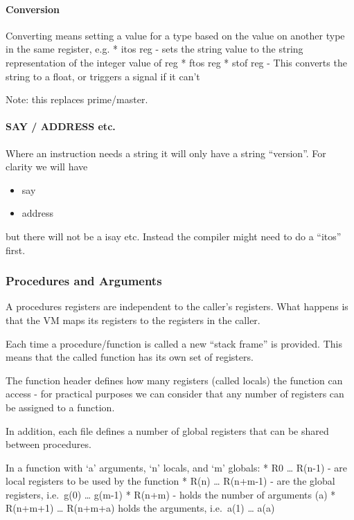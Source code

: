 \hypertarget{conversion}{%
\paragraph{Conversion}\label{conversion}}

Converting means setting a value for a type based on the value on
another type in the same register, e.g. * itos reg - sets the string
value to the string representation of the integer value of reg * ftos
reg * stof reg - This converts the string to a float, or triggers a
signal if it can't

Note: this replaces prime/master.

\hypertarget{say-address-etc.}{%
\paragraph{SAY / ADDRESS etc.}\label{say-address-etc.}}

Where an instruction needs a string it will only have a string
``version''. For clarity we will have

\begin{itemize}
\tightlist
\item
  say
\item
  address
\end{itemize}

but there will not be a isay etc. Instead the compiler might need to do
a ``itos'' first.

\hypertarget{procedures-and-arguments}{%
\subsubsection{Procedures and
Arguments}\label{procedures-and-arguments}}

A procedures registers are independent to the caller's registers. What
happens is that the VM maps its registers to the registers in the
caller.

Each time a procedure/function is called a new ``stack frame'' is
provided. This means that the called function has its own set of
registers.

The function header defines how many registers (called locals) the
function can access - for practical purposes we can consider that any
number of registers can be assigned to a function.

In addition, each file defines a number of global registers that can be
shared between procedures.

In a function with `a' arguments, `n' locals, and `m' globals: * R0
\ldots{} R(n-1) - are local registers to be used by the function * R(n)
\ldots{} R(n+m-1) - are the global registers, i.e.~g(0) \ldots{} g(m-1)
* R(n+m) - holds the number of arguments (a) * R(n+m+1) \ldots{}
R(n+m+a) holds the arguments, i.e.~a(1) \ldots{} a(a)

